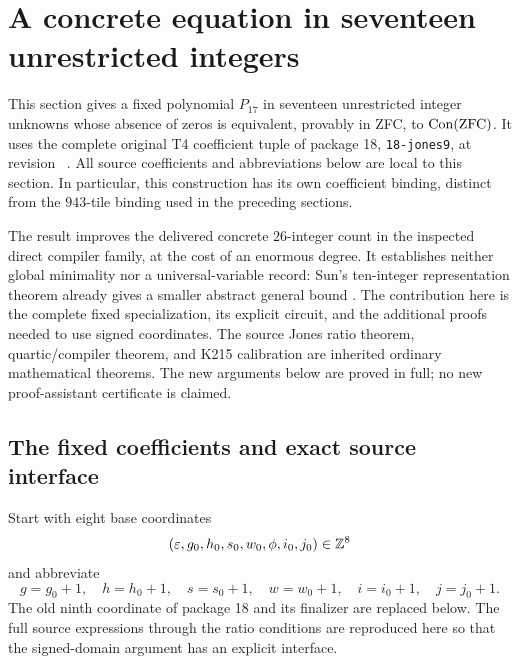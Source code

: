 \section{A concrete equation in seventeen unrestricted integers}
\label{sec:integer17}

This section gives a fixed polynomial $P_{17}$ in seventeen unrestricted
integer unknowns whose absence of zeros is equivalent, provably in ZFC, to
$\operatorname{Con}(\mathrm{ZFC})$. It uses the complete original T4 coefficient tuple of
package 18, \texttt{18-jones9}, at revision \pin\ \cite{jones9}.
All source coefficients and abbreviations below are local to this section.
In particular, this construction has its own coefficient binding, distinct
from the $943$-tile binding used in the preceding sections.

The result improves the delivered concrete $26$-integer count in the
inspected direct compiler family, at the cost of an enormous degree.
It establishes neither global minimality nor a universal-variable record:
Sun's ten-integer representation theorem already gives a smaller abstract
general bound \cite{sun2026}. The contribution here is the complete fixed
specialization, its explicit circuit, and the additional proofs needed to
use signed coordinates. The source Jones ratio theorem, quartic/compiler
theorem, and K215 calibration are inherited ordinary mathematical theorems.
The new arguments below are proved in full; no new proof-assistant
certificate is claimed.

\subsection{The fixed coefficients and exact source interface}
\label{i17:source}

Start with eight base coordinates
\[
 (\varepsilon,g_0,h_0,s_0,w_0,\phi,i_0,j_0)\in\mathbb Z^8
\]
and abbreviate
\[
 g=g_0+1,\quad h=h_0+1,\quad s=s_0+1,\quad
 w=w_0+1,\quad i=i_0+1,\quad j=j_0+1.
\]
The old ninth coordinate of package 18 and its finalizer are replaced
below. The full source expressions through the ratio conditions are
reproduced here so that the signed-domain argument has an explicit
interface.


